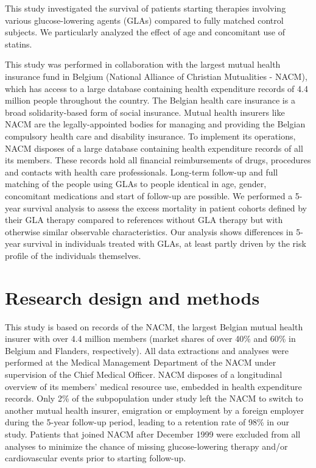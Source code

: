 This study investigated the survival of patients starting therapies involving various glucose-lowering agents (GLAs) compared to fully matched control subjects. We particularly analyzed the effect of age and concomitant use of statins.

This study was performed in collaboration with the largest mutual health insurance fund in Belgium (National Alliance of Christian Mutualities - NACM), which has access to a large database containing health expenditure records of 4.4 million people throughout the country. The Belgian health care insurance is a broad solidarity-based form of social insurance. Mutual health insurers like NACM are the legally-appointed bodies for managing and providing the Belgian compulsory health care and disability insurance. To implement its operations, NACM disposes of a large database containing health expenditure records of all its members. These records hold all financial reimbursements of drugs, procedures and contacts with health care professionals. Long-term follow-up and full matching of the people using GLAs to people identical in age, gender, concomitant medications and start of follow-up are possible. We performed a 5-year survival analysis to assess the excess mortality in patient cohorts defined by their GLA therapy compared to references without GLA therapy but with otherwise similar observable characteristics. Our analysis shows differences in 5-year survival in individuals treated with GLAs, at least partly driven by the risk profile of the individuals themselves. 

\section{Research design and methods}

This study is based on records of the NACM, the largest Belgian mutual health insurer with over 4.4 million members (market shares of over 40\% and 60\% in Belgium and Flanders, respectively). All data extractions and analyses were performed at the Medical Management Department of the NACM under supervision of the Chief Medical Officer.
NACM disposes of a longitudinal overview of its members' medical resource use, embedded in health expenditure records. Only 2\% of the subpopulation under study left the NACM to switch to another mutual health insurer, emigration or employment by a foreign employer during the 5-year follow-up period, leading to a retention rate of 98\% in our study. Patients that joined NACM after December 1999 were excluded from all analyses to minimize the chance of missing glucose-lowering therapy and/or cardiovascular events prior to starting follow-up.

